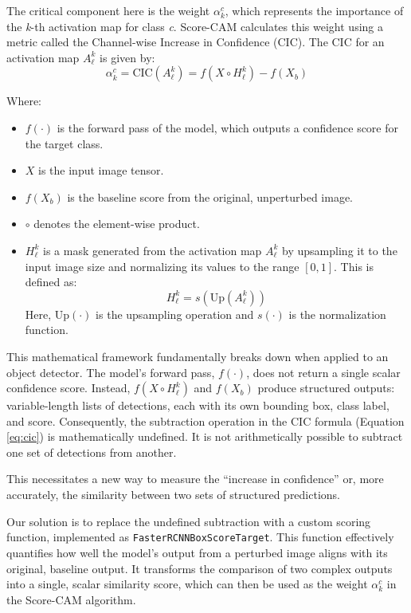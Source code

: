 The critical component here is the weight $\alpha^{c}_{k}$, which represents the importance of the \textit{k}-th activation map for class \textit{c}. Score-CAM calculates this weight using a metric called the Channel-wise Increase in Confidence (CIC). The CIC for an activation map $A^{k}_{\ell}$ is given by:
\begin{equation}
    \alpha_k^c = \text{CIC}\left(A^{k}_{\ell}\right) = f\left(X \circ H^{k}_{\ell}\right) - f(X_{b})
    \label{eq:cic}
\end{equation}

Where:
\begin{itemize}
    \item $f(\cdot)$ is the forward pass of the model, which outputs a confidence score for the target class.
    \item $X$ is the input image tensor.
    \item $f(X_{b})$ is the baseline score from the original, unperturbed image.
    \item $\circ$ denotes the element-wise product.
    \item $H^{k}_{\ell}$ is a mask generated from the activation map $A^{k}_{\ell}$ by upsampling it to the input image size and normalizing its values to the range $[0, 1]$. This is defined as:
    \begin{equation}
        H^{k}_{\ell} = s\left(\text{Up}\left(A^{k}_{\ell}\right)\right)
        \label{eq:mask_generation}
    \end{equation}
    Here, $\text{Up}(\cdot)$ is the upsampling operation and $s(\cdot)$ is the normalization function.
\end{itemize}

This mathematical framework fundamentally breaks down when applied to an object detector. The model's forward pass, $f(\cdot)$, does not return a single scalar confidence score. Instead, $f(X \circ H^{k}_{\ell})$ and $f(X_{b})$ produce structured outputs: variable-length lists of detections, each with its own bounding box, class label, and score. Consequently, the subtraction operation in the CIC formula (Equation \ref{eq:cic}) is mathematically undefined. It is not arithmetically possible to subtract one set of detections from another.

This necessitates a new way to measure the ``increase in confidence'' or, more accurately, the similarity between two sets of structured predictions.

Our solution is to replace the undefined subtraction with a custom scoring function, implemented as \texttt{FasterRCNNBoxScoreTarget}. This function effectively quantifies how well the model's output from a perturbed image aligns with its original, baseline output. It transforms the comparison of two complex outputs into a single, scalar similarity score, which can then be used as the weight $\alpha^{c}_{k}$ in the Score-CAM algorithm.

